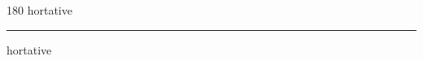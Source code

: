 
\begin{frame}
\begin{center}
\begin{turn}{180}
{\fontsize{2.5cm}{1em}\selectfont hortative}
\end{turn}
\vspace{1em}\par  
\hrule
\vspace{1em}\par  
{\fontsize{2.5cm}{1em}\selectfont hortative}
\end{center}
\end{frame}
